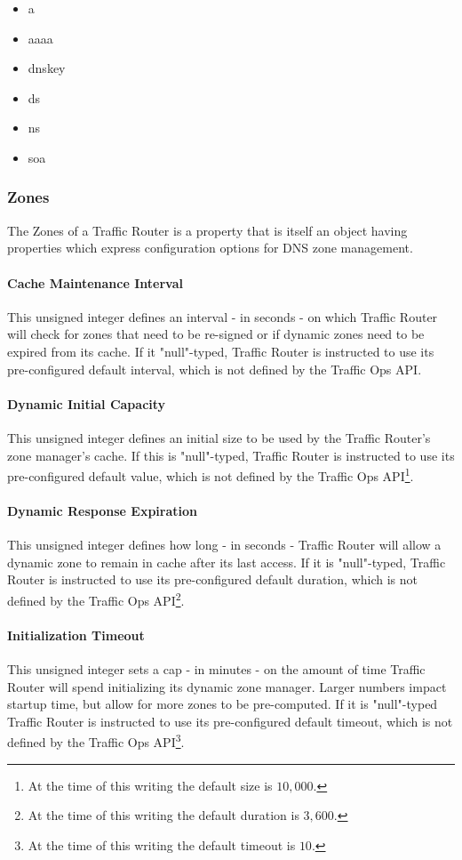 \begin{itemize}
	\item a
	\item aaaa
	\item dnskey
	\item ds
	\item ns
	\item soa
\end{itemize}

\subsubsection{Zones}
The Zones of a Traffic Router is a property that is itself an object having
properties which express configuration options for DNS zone management.

\paragraph{Cache Maintenance Interval}
This unsigned integer defines an interval - in seconds - on which Traffic Router
will check for zones that need to be re-signed or if dynamic zones need to be
expired from its cache. If it "null"-typed, Traffic Router is instructed to use
its pre-configured default interval, which is not defined by the Traffic Ops
API.

\paragraph{Dynamic Initial Capacity}
This unsigned integer defines an initial size to be used by the Traffic Router's
zone manager's cache. If this is "null"-typed, Traffic Router is instructed to
use its pre-configured default value, which is not defined by the Traffic Ops
API\footnote{At the time of this writing the default size is $10,000$.}.

\paragraph{Dynamic Response Expiration}
This unsigned integer defines how long - in seconds - Traffic Router will allow
a dynamic zone to remain in cache after its last access. If it is "null"-typed,
Traffic Router is instructed to use its pre-configured default duration, which
is not defined by the Traffic Ops API\footnote{At the time of this writing the
default duration is $3,600$.}.

\paragraph{Initialization Timeout}
This unsigned integer sets a cap - in minutes - on the amount of time Traffic
Router will spend initializing its dynamic zone manager. Larger numbers impact
startup time, but allow for more zones to be pre-computed. If it is "null"-typed
Traffic Router is instructed to use its pre-configured default timeout, which is
not defined by the Traffic Ops API\footnote{At the time of this writing the
default timeout is $10$.}.

